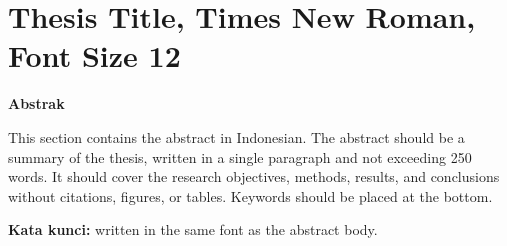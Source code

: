 \chapter*{\large Thesis Title, Times New Roman, Font Size 12}
\begin{center}
    \textbf{Abstrak}
\end{center}
\begin{singlespace}
This section contains the abstract in Indonesian. The abstract should be a summary of the thesis, written in a single paragraph and not exceeding 250 words. It should cover the research objectives, methods, results, and conclusions without citations, figures, or tables. Keywords should be placed at the bottom.

\vspace{0.5cm}
\noindent \textbf{Kata kunci:} written in the same font as the abstract body.
\end{singlespace}
